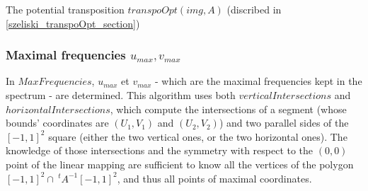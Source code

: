    \begin{algorithme}
    \caption{The potential transposition $transpoOpt(img,A)$ (discribed in \ref{szeliski_transpoOpt_section})}
    \label{szeliski_transpoOpt}
   \end{algorithme}

 \subsubsection{Maximal frequencies $u_{max}, v_{max}$}

In $MaxFrequencies$, $u_{max}$ et $v_{max}$ - which are the maximal frequencies kept in the spectrum - are determined. This algorithm uses both $verticalIntersections$ and $horizontalIntersections$, which compute the intersections of a segment (whose bounds' coordinates are $(U_1,V_1)$ and $(U_2,V_2)$) and two parallel sides of the $[-1,1]^2$ square (either the two vertical ones, or the two horizontal ones). The knowledge of those intersections and the symmetry with respect to the $(0,0)$ point of the linear mapping are sufficient to know all the vertices of the polygon $[-1,1]^2 \cap \ ^t\!\!A^{-1}[-1,1]^2$, and thus all points of maximal coordinates.
 
  
